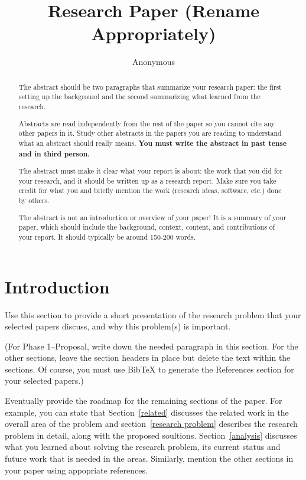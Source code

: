 \documentclass[sigconf, anonymous]{acmart}
\begin{document}
\title{Research Paper (Rename Appropriately)}

\author{Anonymous}
\affiliation{
  \institution{}
}

\begin{abstract}
  The abstract should be two paragraphs that summarize your research
  paper: the first setting up the background and the second
  summarizing what learned from the research.

  Abstracts are read independently from the rest of the paper so you
  cannot cite any other papers in it. Study other abstracts in the
  papers you are reading to understand what an abstract should really
  means. {\bf You must write the abstract in past tense and in third
    person.}

  The abstract must make it clear what your report is about: the work
  that you did for your research, and it should be written up as a
  research report. Make sure you take credit for what you and briefly
  mention the work (research ideas, software, etc.) done by others.

  The abstract is not an introduction or overview of your paper! It is
  a summary of your paper, which should include the background,
  context, content, and contributions of your report. It should
  typically be around 150-200 words.
\end{abstract}


\maketitle

\section{Introduction}
\label{intro}

Use this section to provide a short presentation of the research
problem that your selected papers discuss, and why this problem(s) is
important.

(For Phase 1--Proposal, write down the needed paragraph in this
section. For the other sections, leave the section headers in place
but delete the text within the sections. Of course, you must use
BibTeX to generate the References section for your selected papers.)

Eventually provide the roadmap for the remaining sections of the
paper. For example, you can state that Section~\ref{related} discusses
the related work in the overall area of the problem and
section~\ref{research problem} describes the research problem in
detail, along with the proposed soultions. Section~\ref{analysis}
discusses what you learned about solving the research problem, its
current status and future work that is needed in the areas.
Similarly, mention the other sections in your paper using appopriate
references.
\end{document}
